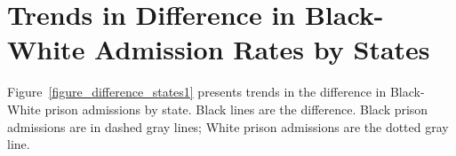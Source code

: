 \documentclass[12pt]{article}
\begin{document}
\clearpage













 \section{Trends in Difference in Black-White Admission Rates by States}\label{appendix_diff_rates_states}
 \setcounter{table}{0}
 \setcounter{figure}{0}
 \renewcommand{\thetable}{D\arabic{table}}
 \renewcommand{\thefigure}{D\arabic{figure}}
 \normalsize

Figure~\ref{figure_difference_states1} presents trends in the difference in Black-White prison admissions by state.  Black lines are the difference.  Black prison admissions are in dashed gray lines; White prison admissions are the dotted gray line.
\end{document}
